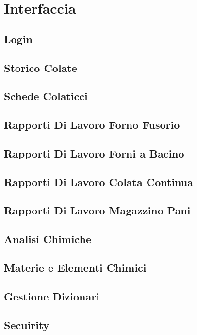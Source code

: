 \chapter{Interfaccia}
  \label{chapter_interfaccia}
  \section{Login}
  \section{Storico Colate}
  \section{Schede Colaticci}
  \section{Rapporti Di Lavoro Forno Fusorio}
  \section{Rapporti Di Lavoro Forni a Bacino}
  \section{Rapporti Di Lavoro Colata Continua}
  \section{Rapporti Di Lavoro Magazzino Pani}
  \section{Analisi Chimiche}
  \section{Materie e Elementi Chimici}
  \section{Gestione Dizionari}
  \section{Secuirity}
